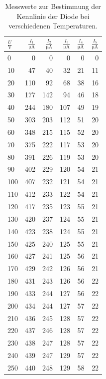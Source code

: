 \documentclass[11pt,ngerman,a4paper]{article}
\begin{document}
\begin{table}
\centering
\begin{tabular}{l|rrrrr}
\toprule
$\frac{U}{\si{\volt}} $&$\frac {I_1}{\si{\micro\ampere}}$&$\frac {I_2}{\si{\micro\ampere}}$ &$\frac {I_3}{\si{\micro\ampere}}$&$\frac {I_4}{\si{\micro\ampere}}$&$\frac {I_5}{\si{\micro\ampere}}$\\
\midrule
0 & 0 & 0 & 0 & 0 & 0\\
10 & 47 & 40 & 32 & 21 & 11\\
20 & 110 & 92 & 68 & 38 & 16\\
30 & 177 & 142 & 94 & 46 & 18\\
40 & 244 & 180 & 107 & 49 & 19\\
50 & 303 & 203 & 112 & 51 & 20\\
60 & 348 & 215 & 115 & 52 & 20\\
70 & 375 & 222 & 117 & 53 & 20\\
80 & 391 & 226 & 119 & 53 & 20\\
90 & 402 & 229 & 120 & 54 & 21\\
100 & 407 & 232 & 121 & 54 & 21\\
110 & 412 & 233 & 122 & 54 & 21\\
120 & 417 & 235 & 123 & 55 & 21\\
130 & 420 & 237 & 124 & 55 & 21\\
140 & 423 & 238 & 124 & 55 & 21\\
150 & 425 & 240 & 125 & 55 & 21\\
160 & 427 & 241 & 125 & 56 & 21\\
170 & 429 & 242 & 126 & 56 & 21\\
180 & 431 & 243 & 126 & 56 & 22\\
190 & 433 & 244 & 127 & 56 & 22\\
200 & 434 & 244 & 127 & 57 & 22\\
210 & 436 & 245 & 128 & 57 & 22\\
220 & 437 & 246 & 128 & 57 & 22\\
230 & 438 & 247 & 128 & 57 & 22\\
240 & 439 & 247 & 129 & 57 & 22\\
250 & 440 & 248 & 129 & 58 & 22\\
\bottomrule
\end{tabular}

\caption{Messwerte zur Bestimmung der Kennlinie der Diode bei verschiedenen Temperaturen.}
\label{tab_a}
\end{table}
\end{document}
